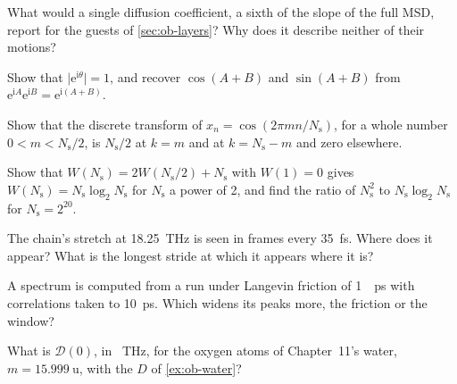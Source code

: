\begin{exercise}
\label{ex:ob-trace}
What would a single diffusion coefficient, a sixth of the slope of the
full MSD, report for the guests of \cref{sec:ob-layers}? Why does it
describe neither of their motions?
\end{exercise}

\begin{exercise}
\label{ex:ob-euler}
Show that $\lvert\mathrm{e}^{\mathrm{i}\theta}\rvert = 1$, and recover
$\cos(A + B)$ and $\sin(A + B)$ from $\mathrm{e}^{\mathrm{i}A}
\mathrm{e}^{\mathrm{i}B} = \mathrm{e}^{\mathrm{i}(A + B)}$.
\end{exercise}

\begin{exercise}
\label{ex:ob-dft-cos}
Show that the discrete transform of $x_n = \cos(2\pi mn/N_{\mathrm s})$,
for a whole number $0 < m < N_{\mathrm s}/2$, is $N_{\mathrm s}/2$ at $k =
m$ and at $k = N_{\mathrm s} - m$ and zero elsewhere.
\end{exercise}

\begin{exercise}
\label{ex:ob-fft-cost}
Show that $W(N_{\mathrm s}) = 2W(N_{\mathrm s}/2) + N_{\mathrm s}$ with $W(1)
= 0$ gives $W(N_{\mathrm s}) = N_{\mathrm s}\log_2N_{\mathrm s}$ for
$N_{\mathrm s}$ a power of 2, and find the ratio of $N_{\mathrm s}^2$ to
$N_{\mathrm s}\log_2N_{\mathrm s}$ for $N_{\mathrm s} = 2^{20}$.
\end{exercise}

\begin{exercise}
\label{ex:ob-fold}
The chain's stretch at \SI{18.25}{\tera\hertz} is seen in frames every
\SI{35}{\femto\second}. Where does it appear? What is the longest stride
at which it appears where it is?
\end{exercise}

\begin{exercise}
\label{ex:ob-width}
A spectrum is computed from a run under Langevin friction of
\SI{1}{\per\pico\second} with correlations taken to \SI{10}{\pico\second}.
Which widens its peaks more, the friction or the window?
\end{exercise}

\begin{exercise}
\label{ex:ob-vdos-zero}
What is $\mathcal{D}(0)$, in \si{\per\tera\hertz}, for the oxygen atoms of
Chapter~11's water, $m = \SI{15.999}{\amu}$, with the $D$ of
\cref{ex:ob-water}?
\end{exercise}

